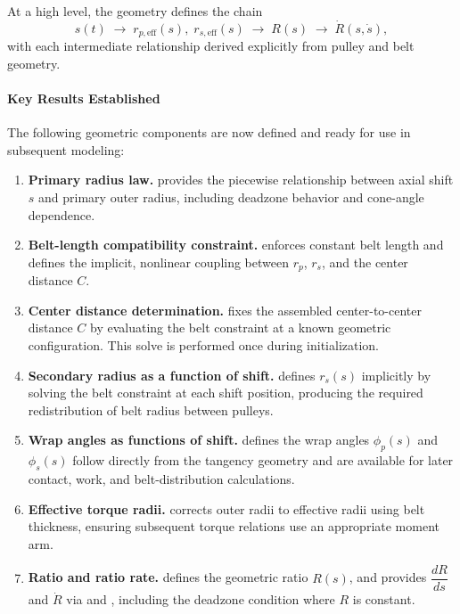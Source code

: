 \documentclass[11pt]{article}
\numberwithin{equation}{section}
\begin{document}
At a high level, the geometry defines the chain
\[
s(t)
\;\longrightarrow\;
r_{p,\text{eff}}(s),\; r_{s,\text{eff}}(s)
\;\longrightarrow\;
R(s)
\;\longrightarrow\;
\dot R(s,\dot s),
\]
with each intermediate relationship derived explicitly from pulley and belt geometry.

\paragraph{Key Results Established}

The following geometric components are now defined and ready for use in subsequent modeling:

\begin{enumerate}
    \item \textbf{Primary radius law.}  
     provides the piecewise relationship between axial shift $s$
    and primary outer radius, including deadzone behavior and cone-angle dependence.

    \item \textbf{Belt-length compatibility constraint.}  
     enforces constant belt length and defines the implicit,
    nonlinear coupling between $r_p$, $r_s$, and the center distance $C$.

    \item \textbf{Center distance determination.}  
     fixes the assembled center-to-center distance $C$ by evaluating
    the belt constraint at a known geometric configuration. This solve is performed once
    during initialization.

    \item \textbf{Secondary radius as a function of shift.}  
     defines $r_s(s)$ implicitly by solving the belt constraint at
    each shift position, producing the required redistribution of belt radius between pulleys.

    \item \textbf{Wrap angles as functions of shift.}  
     defines the wrap angles $\phi_p(s)$ and $\phi_s(s)$ follow directly from the tangency geometry and
    are available for later contact, work, and belt-distribution calculations.

    \item \textbf{Effective torque radii.}  
     corrects outer radii to effective radii using belt
    thickness, ensuring subsequent torque relations use an appropriate moment arm.

    \item \textbf{Ratio and ratio rate.}  
     defines the geometric ratio $R(s)$, and  provides
    $\dfrac{dR}{ds}$ and $\dot R$ via  and , including the
    deadzone condition where $R$ is constant.
\end{enumerate}
\end{document}
